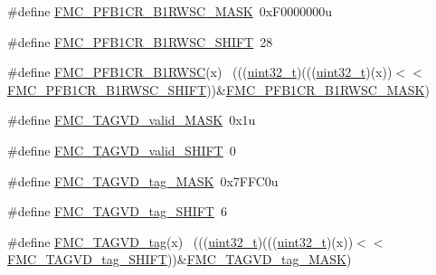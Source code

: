 \begin{DoxyCompactItemize}
\item 
\#define \hyperlink{group___f_m_c___register___masks_ga3ab917a9071f70118eaabd80f2ec08e4}{F\+M\+C\+\_\+\+P\+F\+B1\+C\+R\+\_\+\+B1\+R\+W\+S\+C\+\_\+\+M\+A\+SK}~0x\+F0000000u
\item 
\#define \hyperlink{group___f_m_c___register___masks_ga72daab1c5e2db3b1e521590edc2a153a}{F\+M\+C\+\_\+\+P\+F\+B1\+C\+R\+\_\+\+B1\+R\+W\+S\+C\+\_\+\+S\+H\+I\+FT}~28
\item 
\#define \hyperlink{group___f_m_c___register___masks_ga62a71a9c738bba11004689f982f84450}{F\+M\+C\+\_\+\+P\+F\+B1\+C\+R\+\_\+\+B1\+R\+W\+SC}(x)                                      ~(((\hyperlink{_p_e___types_8h_a33594304e786b158f3fb30289278f5af}{uint32\+\_\+t})(((\hyperlink{_p_e___types_8h_a33594304e786b158f3fb30289278f5af}{uint32\+\_\+t})(x))$<$$<$\hyperlink{group___f_m_c___register___masks_ga72daab1c5e2db3b1e521590edc2a153a}{F\+M\+C\+\_\+\+P\+F\+B1\+C\+R\+\_\+\+B1\+R\+W\+S\+C\+\_\+\+S\+H\+I\+FT}))\&\hyperlink{group___f_m_c___register___masks_ga3ab917a9071f70118eaabd80f2ec08e4}{F\+M\+C\+\_\+\+P\+F\+B1\+C\+R\+\_\+\+B1\+R\+W\+S\+C\+\_\+\+M\+A\+SK})
\item 
\#define \hyperlink{group___f_m_c___register___masks_ga4cb93c0b6eac8e4c1d39d248ad8bf143}{F\+M\+C\+\_\+\+T\+A\+G\+V\+D\+\_\+valid\+\_\+\+M\+A\+SK}~0x1u
\item 
\#define \hyperlink{group___f_m_c___register___masks_gad6afeb0885f0d5b21e78f96470e8843a}{F\+M\+C\+\_\+\+T\+A\+G\+V\+D\+\_\+valid\+\_\+\+S\+H\+I\+FT}~0
\item 
\#define \hyperlink{group___f_m_c___register___masks_ga84d9df5059d93e9d8c206114912e728f}{F\+M\+C\+\_\+\+T\+A\+G\+V\+D\+\_\+tag\+\_\+\+M\+A\+SK}~0x7\+F\+F\+C0u
\item 
\#define \hyperlink{group___f_m_c___register___masks_gae47539ff4ee56bb429932a28a2a4551b}{F\+M\+C\+\_\+\+T\+A\+G\+V\+D\+\_\+tag\+\_\+\+S\+H\+I\+FT}~6
\item 
\#define \hyperlink{group___f_m_c___register___masks_gabbc7c41cb4e1ae572c110788068f157a}{F\+M\+C\+\_\+\+T\+A\+G\+V\+D\+\_\+tag}(x)                                              ~(((\hyperlink{_p_e___types_8h_a33594304e786b158f3fb30289278f5af}{uint32\+\_\+t})(((\hyperlink{_p_e___types_8h_a33594304e786b158f3fb30289278f5af}{uint32\+\_\+t})(x))$<$$<$\hyperlink{group___f_m_c___register___masks_gae47539ff4ee56bb429932a28a2a4551b}{F\+M\+C\+\_\+\+T\+A\+G\+V\+D\+\_\+tag\+\_\+\+S\+H\+I\+FT}))\&\hyperlink{group___f_m_c___register___masks_ga84d9df5059d93e9d8c206114912e728f}{F\+M\+C\+\_\+\+T\+A\+G\+V\+D\+\_\+tag\+\_\+\+M\+A\+SK})

\end{DoxyCompactItemize}
